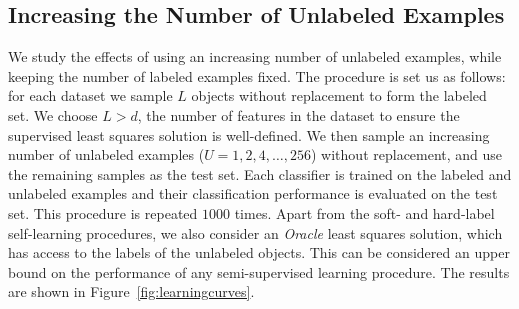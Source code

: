 \documentclass[conference,a4paper,10pt]{IEEEtran}\usepackage[]{graphicx}\usepackage[]{color}
\begin{document}
\subsection{Increasing the Number of Unlabeled Examples}
We study the effects of using an increasing number of unlabeled examples, while keeping the number of labeled examples fixed. The procedure is set us as follows: for each dataset we sample $L$ objects without replacement to form the labeled set. We choose $L>d$, the number of features in the dataset to ensure the supervised least squares solution is well-defined. We then sample an increasing number of unlabeled examples ($U=1,2,4,\dots,256$) without replacement, and use the remaining samples as the test set. Each classifier is trained on the labeled and unlabeled examples and their classification performance is evaluated on the test set. This procedure is repeated $1000$ times. Apart from the soft- and hard-label self-learning procedures, we also consider an \emph{Oracle} least squares solution, which has access to the labels of the unlabeled objects. This can be considered an upper bound on the performance of any semi-supervised learning procedure. The results are shown in Figure~\ref{fig:learningcurves}.
\end{document}
